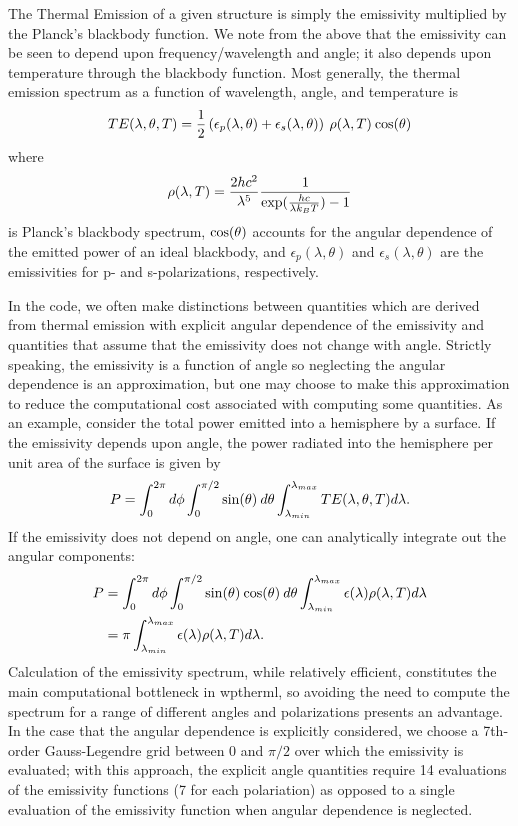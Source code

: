 \documentclass[journal=jpclcd,manuscript=suppinfo]{achemso}
\begin{document}
The Thermal Emission of a given structure is simply the emissivity multiplied
by the Planck's blackbody function.  We note from the above that the emissivity
can be seen to depend upon frequency/wavelength and angle; it also depends
upon temperature through the blackbody function.  Most generally, the thermal emission
spectrum as a function of wavelength, angle, and temperature is
\begin{equation}
TE(\lambda, \theta, T) = 
\frac{1}{2}\left( \epsilon_p(\lambda, \theta) + \epsilon_s(\lambda, \theta) \right) \:
\rho(\lambda, T) \: {\rm cos}(\theta)
\end{equation} 
where 
\begin{equation}
\rho(\lambda, T) = \frac{2hc^2}{\lambda^5} 
\frac{1}{{\rm exp}(\frac{hc}{\lambda k_B T})-1}
\end{equation}
is Planck's blackbody spectrum, ${\rm cos}(\theta)$ accounts
for the angular dependence of the emitted power of an ideal blackbody, and $\epsilon_p(\lambda, \theta)$ and $\epsilon_s(\lambda, \theta)$ are the emissivities for p- and s-polarizations, respectively.

In the code, we often make distinctions between quantities which are derived
from thermal emission with explicit angular dependence of the emissivity and quantities
that assume that the emissivity does not change with angle.  Strictly speaking, 
the emissivity is a function of angle so neglecting the angular dependence is an 
approximation, but one may choose to make this approximation to reduce the computational
cost associated with computing some quantities.  As an example, consider the total 
power emitted into a hemisphere by a surface.  If the emissivity depends upon angle, the
power radiated into the hemisphere per unit area of the surface is given by
\begin{equation}
P = \int_0^{2\pi} d\phi \int_0^{\pi/2} {\rm sin}(\theta) \: d\theta 
\int_{\lambda_{min}}^{\lambda_{max}} TE(\lambda, \theta, T) d\lambda.
\end{equation}   
If the emissivity does not depend on angle, one can analytically integrate out the 
angular components:
\begin{align}
P &= \int_0^{2\pi} d\phi \int_0^{\pi/2} {\rm sin}(\theta) \: {\rm cos}(\theta) \: d\theta  
\int_{\lambda_{min}}^{\lambda_{max}} \epsilon(\lambda) \rho(\lambda, T) d\lambda \\
 &= \pi \int_{\lambda_{min}}^{\lambda_{max}} \epsilon(\lambda) \rho(\lambda, T) d\lambda.
\end{align}
Calculation of the emissivity spectrum, while relatively efficient,  
constitutes the main computational bottleneck in wptherml, so avoiding
the need to compute the spectrum for a range of different angles and polarizations
presents an advantage.  In the case that the angular dependence is explicitly considered,
we choose a 7th-order Gauss-Legendre grid between 0 and $\pi/2$ over which the emissivity
is evaluated; with this approach, the explicit angle quantities require 14 evaluations
of the emissivity functions (7 for each polariation) as opposed to a single
evaluation of the emissivity function when angular dependence is neglected.
\end{document}
